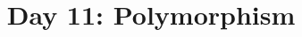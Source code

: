 \documentclass{article}
\begin{document}
\title{Day 11: Polymorphism}
\author{}
\date{}
\maketitle




\end{document}
